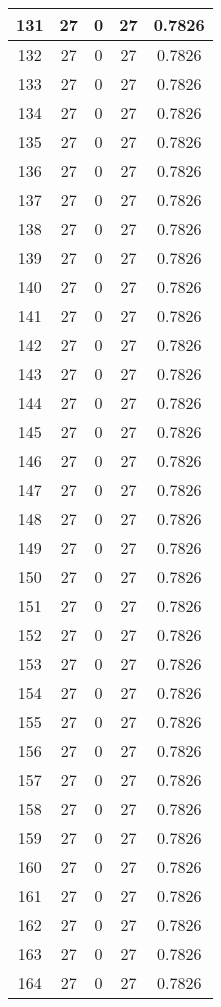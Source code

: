 \documentclass[letterpaper, 12pt]{article}
\begin{document}
\begin{longtable}{|c|c|c|c|c|}
\hline
131 & 27 & 0 & 27 & 0.7826 \\
\hline
132 & 27 & 0 & 27 & 0.7826 \\
\hline
133 & 27 & 0 & 27 & 0.7826 \\
\hline
134 & 27 & 0 & 27 & 0.7826 \\
\hline
135 & 27 & 0 & 27 & 0.7826 \\
\hline
136 & 27 & 0 & 27 & 0.7826 \\
\hline
137 & 27 & 0 & 27 & 0.7826 \\
\hline
138 & 27 & 0 & 27 & 0.7826 \\
\hline
139 & 27 & 0 & 27 & 0.7826 \\
\hline
140 & 27 & 0 & 27 & 0.7826 \\
\hline
141 & 27 & 0 & 27 & 0.7826 \\
\hline
142 & 27 & 0 & 27 & 0.7826 \\
\hline
143 & 27 & 0 & 27 & 0.7826 \\
\hline
144 & 27 & 0 & 27 & 0.7826 \\
\hline
145 & 27 & 0 & 27 & 0.7826 \\
\hline
146 & 27 & 0 & 27 & 0.7826 \\
\hline
147 & 27 & 0 & 27 & 0.7826 \\
\hline
148 & 27 & 0 & 27 & 0.7826 \\
\hline
149 & 27 & 0 & 27 & 0.7826 \\
\hline
150 & 27 & 0 & 27 & 0.7826 \\
\hline
151 & 27 & 0 & 27 & 0.7826 \\
\hline
152 & 27 & 0 & 27 & 0.7826 \\
\hline
153 & 27 & 0 & 27 & 0.7826 \\
\hline
154 & 27 & 0 & 27 & 0.7826 \\
\hline
155 & 27 & 0 & 27 & 0.7826 \\
\hline
156 & 27 & 0 & 27 & 0.7826 \\
\hline
157 & 27 & 0 & 27 & 0.7826 \\
\hline
158 & 27 & 0 & 27 & 0.7826 \\
\hline
159 & 27 & 0 & 27 & 0.7826 \\
\hline
160 & 27 & 0 & 27 & 0.7826 \\
\hline
161 & 27 & 0 & 27 & 0.7826 \\
\hline
162 & 27 & 0 & 27 & 0.7826 \\
\hline
163 & 27 & 0 & 27 & 0.7826 \\
\hline
164 & 27 & 0 & 27 & 0.7826 \\

\end{longtable}
\end{document}
